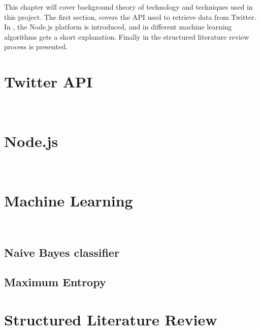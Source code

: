 This chapter will cover background theory of technology and techniques used in this project. 
The first section,  covers the API used to retrieve data from Twitter. In , the Node.js platform is introduced, and in  different machine learning algorithms gets a short explanation. Finally in  the structured literature review process is presented. 


\section{Twitter API}~\label{sec:twitterapi}


\section{Node.js}~\label{sec:nodejs}
	

\section{Machine Learning}~\label{sec:ml}
	\subsection{Naive Bayes classifier}
	
	
	\subsection{Maximum Entropy}
	

\section{Structured Literature Review}~\label{sec:backgroundslr}
